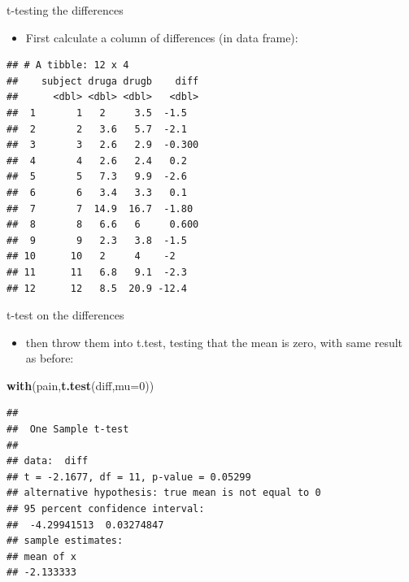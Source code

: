 \documentclass[ignorenonframetext,]{beamer}
\newenvironment{Shaded}{\begin{snugshade}}{\end{snugshade}}
\newcommand{\DataTypeTok}[1]{\textcolor[rgb]{0.13,0.29,0.53}{#1}}
\newcommand{\DecValTok}[1]{\textcolor[rgb]{0.00,0.00,0.81}{#1}}
\newcommand{\KeywordTok}[1]{\textcolor[rgb]{0.13,0.29,0.53}{\textbf{#1}}}
\newcommand{\NormalTok}[1]{#1}
\newcommand{\OperatorTok}[1]{\textcolor[rgb]{0.81,0.36,0.00}{\textbf{#1}}}
\newcommand{\StringTok}[1]{\textcolor[rgb]{0.31,0.60,0.02}{#1}}
\providecommand{\tightlist}{%
  \setlength{\itemsep}{0pt}\setlength{\parskip}{0pt}}
\begin{document}
\begin{frame}[fragile]{t-testing the differences}
\protect\hypertarget{t-testing-the-differences}{}

\begin{itemize}
\tightlist
\item
  First calculate a column of differences (in data frame):
\end{itemize}

\begin{Shaded}
\end{Shaded}

\begin{verbatim}
## # A tibble: 12 x 4
##    subject druga drugb    diff
##      <dbl> <dbl> <dbl>   <dbl>
##  1       1   2     3.5  -1.5  
##  2       2   3.6   5.7  -2.1  
##  3       3   2.6   2.9  -0.300
##  4       4   2.6   2.4   0.2  
##  5       5   7.3   9.9  -2.6  
##  6       6   3.4   3.3   0.1  
##  7       7  14.9  16.7  -1.80 
##  8       8   6.6   6     0.600
##  9       9   2.3   3.8  -1.5  
## 10      10   2     4    -2    
## 11      11   6.8   9.1  -2.3  
## 12      12   8.5  20.9 -12.4
\end{verbatim}

\end{frame}

\begin{frame}[fragile]{t-test on the differences}
\protect\hypertarget{t-test-on-the-differences}{}

\begin{itemize}
\tightlist
\item
  then throw them into t.test, testing that the mean is zero, with same
  result as before:
\end{itemize}

\begin{Shaded}
\begin{Highlighting}[]
\KeywordTok{with}\NormalTok{(pain,}\KeywordTok{t.test}\NormalTok{(diff,}\DataTypeTok{mu=}\DecValTok{0}\NormalTok{))}
\end{Highlighting}
\end{Shaded}

\begin{verbatim}
## 
##  One Sample t-test
## 
## data:  diff
## t = -2.1677, df = 11, p-value = 0.05299
## alternative hypothesis: true mean is not equal to 0
## 95 percent confidence interval:
##  -4.29941513  0.03274847
## sample estimates:
## mean of x 
## -2.133333
\end{verbatim}

\end{frame}
\end{document}
